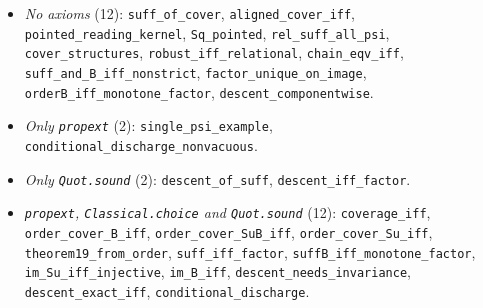 \begin{itemize}\raggedright
\item \emph{No axioms} (12):
\texttt{suff\_of\_cover}, \texttt{aligned\_cover\_iff}, \texttt{pointed\_reading\_kernel}, \texttt{Sq\_pointed}, \texttt{rel\_suff\_all\_psi}, \texttt{cover\_structures}, \texttt{robust\_iff\_relational}, \texttt{chain\_eqv\_iff}, \texttt{suff\_and\_B\_iff\_nonstrict}, \texttt{factor\_unique\_on\_image}, \texttt{orderB\_iff\_monotone\_factor}, \texttt{descent\_componentwise}.
\item \emph{Only \texttt{propext}} (2):
\texttt{single\_psi\_example}, \texttt{conditional\_discharge\_nonvacuous}.
\item \emph{Only \texttt{Quot.sound}} (2):
\texttt{descent\_of\_suff}, \texttt{descent\_iff\_factor}.
\item \emph{\texttt{propext}, \texttt{Classical.choice} and \texttt{Quot.sound}} (12):
\texttt{coverage\_iff}, \texttt{order\_cover\_B\_iff}, \texttt{order\_cover\_SuB\_iff}, \texttt{order\_cover\_Su\_iff}, \texttt{theorem19\_from\_order}, \texttt{suff\_iff\_factor}, \texttt{suffB\_iff\_monotone\_factor}, \texttt{im\_Su\_iff\_injective}, \texttt{im\_B\_iff}, \texttt{descent\_needs\_invariance}, \texttt{descent\_exact\_iff}, \texttt{conditional\_discharge}.
\end{itemize}
